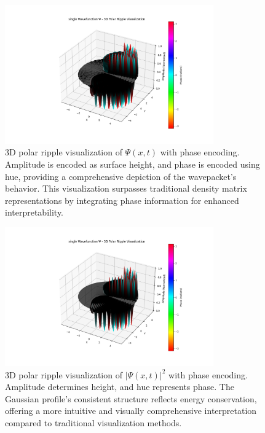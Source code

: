 \documentclass[12pt]{article}
\begin{document}
\begin{figure}[H]
    \centering
    \includegraphics[width=0.8\textwidth]{images/single_wavefunction_3d_polar_with_phase.png}
    \caption{3D polar ripple visualization of \(\Psi(x,t)\) with phase encoding. Amplitude is encoded as surface height, and phase is encoded using hue, providing a comprehensive depiction of the wavepacket's behavior. This visualization surpasses traditional density matrix representations by integrating phase information for enhanced interpretability.}
    \label{fig:single_3d_polar}
\end{figure}

\begin{figure}[H]
    \centering
    \includegraphics[width=0.8\textwidth]{images/single_wavefunction_3d_polar_probability_density_with_phase.png}
    \caption{3D polar ripple visualization of \(|\Psi(x,t)|^2\) with phase encoding. Amplitude determines height, and hue represents phase. The Gaussian profile's consistent structure reflects energy conservation, offering a more intuitive and visually comprehensive interpretation compared to traditional visualization methods.}
    \label{fig:single_3d_polar_density}
\end{figure}
\end{document}
